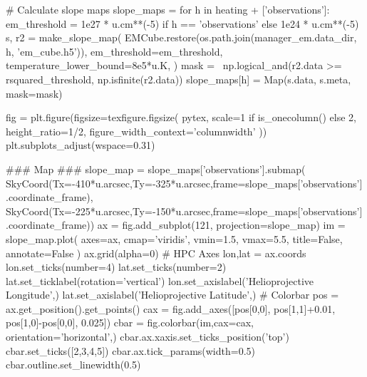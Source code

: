 \begin{pycode}[manager_em]
# Calculate slope maps
slope_maps = {}
for h in heating + ['observations']:
    em_threshold = 1e27 * u.cm**(-5) if h == 'observations' else 1e24 * u.cm**(-5)
    s, r2 = make_slope_map(
        EMCube.restore(os.path.join(manager_em.data_dir, h, 'em_cube.h5')),
        em_threshold=em_threshold,
        temperature_lower_bound=8e5*u.K,
    )
    mask = ~np.logical_and(r2.data >= rsquared_threshold, np.isfinite(r2.data))
    slope_maps[h] = Map(s.data, s.meta, mask=mask)

fig = plt.figure(figsize=texfigure.figsize(
    pytex,
    scale=1 if is_onecolumn() else 2,
    height_ratio=1/2,
    figure_width_context='columnwidth'
))
plt.subplots_adjust(wspace=0.31)

### Map ###
slope_map = slope_maps['observations'].submap(
    SkyCoord(Tx=-410*u.arcsec,Ty=-325*u.arcsec,frame=slope_maps['observations'].coordinate_frame),
    SkyCoord(Tx=-225*u.arcsec,Ty=-150*u.arcsec,frame=slope_maps['observations'].coordinate_frame))
ax = fig.add_subplot(121, projection=slope_map)
im = slope_map.plot(
    axes=ax,
    cmap='viridis',
    vmin=1.5,
    vmax=5.5,
    title=False,
    annotate=False
)
ax.grid(alpha=0)
# HPC Axes
lon,lat = ax.coords
lon.set_ticks(number=4)
lat.set_ticks(number=2)
lat.set_ticklabel(rotation='vertical')
lon.set_axislabel('Helioprojective Longitude',)
lat.set_axislabel('Helioprojective Latitude',)
# Colorbar
pos = ax.get_position().get_points()
cax = fig.add_axes([pos[0,0], pos[1,1]+0.01, pos[1,0]-pos[0,0], 0.025])
cbar = fig.colorbar(im,cax=cax, orientation='horizontal',)
cbar.ax.xaxis.set_ticks_position('top')
cbar.set_ticks([2,3,4,5])
cbar.ax.tick_params(width=0.5)
cbar.outline.set_linewidth(0.5)


\end{pycode}

